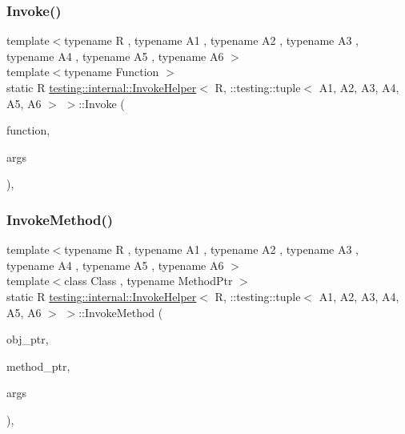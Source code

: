 \subsubsection{\texorpdfstring{Invoke()}{Invoke()}}
{\footnotesize\ttfamily template$<$typename R , typename A1 , typename A2 , typename A3 , typename A4 , typename A5 , typename A6 $>$ \\
template$<$typename Function $>$ \\
static R \mbox{\hyperlink{classtesting_1_1internal_1_1_invoke_helper}{testing\+::internal\+::\+Invoke\+Helper}}$<$ R, \+::testing\+::tuple$<$ A1, A2, A3, A4, A5, A6 $>$ $>$\+::Invoke (\begin{DoxyParamCaption}\item[{\mbox{\hyperlink{structtesting_1_1internal_1_1_function}{Function}}}]{function,  }\item[{const \+::testing\+::tuple$<$ A1, A2, A3, A4, A5, A6 $>$ \&}]{args }\end{DoxyParamCaption})\hspace{0.3cm}{\ttfamily [inline]}, {\ttfamily [static]}}

\mbox{\label{classtesting_1_1internal_1_1_invoke_helper_3_01_r_00_01_1_1testing_1_1tuple_3_01_a1_00_01_a2_00_5653fefa261cff106ebaaf9c78f6ee42_aecdf0f71f5b2c0441b066f62e936805e}} 
\subsubsection{\texorpdfstring{InvokeMethod()}{InvokeMethod()}}
{\footnotesize\ttfamily template$<$typename R , typename A1 , typename A2 , typename A3 , typename A4 , typename A5 , typename A6 $>$ \\
template$<$class Class , typename Method\+Ptr $>$ \\
static R \mbox{\hyperlink{classtesting_1_1internal_1_1_invoke_helper}{testing\+::internal\+::\+Invoke\+Helper}}$<$ R, \+::testing\+::tuple$<$ A1, A2, A3, A4, A5, A6 $>$ $>$\+::Invoke\+Method (\begin{DoxyParamCaption}\item[{Class $\ast$}]{obj\+\_\+ptr,  }\item[{Method\+Ptr}]{method\+\_\+ptr,  }\item[{const \+::testing\+::tuple$<$ A1, A2, A3, A4, A5, A6 $>$ \&}]{args }\end{DoxyParamCaption})\hspace{0.3cm}{\ttfamily [inline]}, {\ttfamily [static]}}



